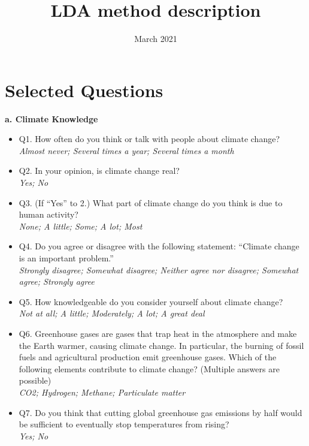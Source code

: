 \documentclass{article}
\title{LDA method description}
\date{March 2021}
\begin{document}
\maketitle

\section{Selected Questions}
\begin{flushleft}
\textbf{a. Climate Knowledge}
\end{flushleft}
\begin{itemize}
    \item Q1. How often do you think or talk with people about climate change?\\
    \textit{Almost never; Several times a year; Several times a month}
    \item Q2. In your opinion, is climate change real?\\
    \textit{Yes; No}
    \item Q3. (If ``Yes'' to 2.) What part of climate change do you think is due to human activity?\\
    \textit{None; A little; Some; A lot; Most}

    \item Q4. Do you agree or disagree with the following statement: ``Climate change is an important problem.''\\
    \textit{Strongly disagree; Somewhat disagree; Neither agree nor disagree; Somewhat agree; Strongly agree}
    \item Q5. How knowledgeable do you consider yourself about climate change?\\
    \textit{Not at all; A little; Moderately; A lot; A great deal}
    \item Q6. Greenhouse gases are gases that trap heat in the atmosphere and make the Earth warmer, causing climate change. In particular, the burning of fossil fuels and agricultural production emit greenhouse gases.
    Which of the following elements contribute to climate change? (Multiple answers are possible) \\
    \textit{CO2; Hydrogen; Methane; Particulate matter}
    \item Q7. Do you think that cutting global greenhouse gas emissions by half would be sufficient to eventually stop temperatures from rising? \\
    \textit{Yes; No}


\end{itemize}
\end{document}
